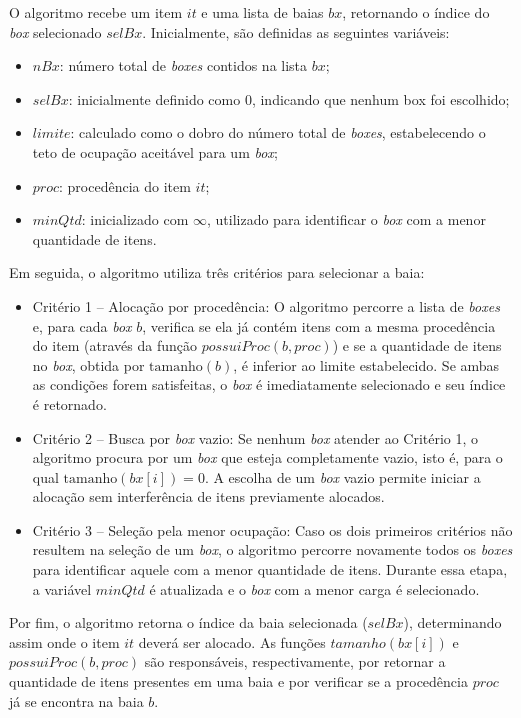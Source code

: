 \documentclass[
    12pt,                %
    openright,           %
    oneside,             %
    a4paper,             %
    english,             %
    spanish,             %
    brazil               %
]{ufscar}
\begin{document}
O algoritmo recebe um item \(it\) e uma lista de baias \(bx\), retornando o índice do \textit{box} selecionado \(selBx\). Inicialmente, são definidas as seguintes variáveis:
\begin{itemize}
    \item \(nBx\): número total de \textit{boxes} contidos na lista \(bx\);
    \item \(selBx\): inicialmente definido como 0, indicando que nenhum box foi escolhido;
    \item \(limite\): calculado como o dobro do número total de \textit{boxes}, estabelecendo o teto de ocupação aceitável para um \textit{box};
    \item \(proc\): procedência do item \(it\);
    \item \(minQtd\): inicializado com \(\infty\), utilizado para identificar o \textit{box} com a menor quantidade de itens.
\end{itemize}

Em seguida, o algoritmo utiliza três critérios para selecionar a baia:
\begin{itemize}
    \item Critério 1 – Alocação por procedência:
    O algoritmo percorre a lista de \textit{boxes} e, para cada \textit{box} \(b\), verifica se ela já contém itens com a mesma procedência do item (através da função \(possuiProc(b, proc)\)) e se a quantidade de itens no \textit{box}, obtida por \(\text{tamanho}(b)\), é inferior ao limite estabelecido. Se ambas as condições forem satisfeitas, o \textit{box} é imediatamente selecionado e seu índice é retornado. 

    \item Critério 2 – Busca por \textit{box} vazio: 
    Se nenhum \textit{box} atender ao Critério 1, o algoritmo procura por um \textit{box} que esteja completamente vazio, isto é, para o qual \(\text{tamanho}(bx[i]) = 0\). A escolha de um \textit{box} vazio permite iniciar a alocação sem interferência de itens previamente alocados.

    \item Critério 3 – Seleção pela menor ocupação:  
    Caso os dois primeiros critérios não resultem na seleção de um \textit{box}, o algoritmo percorre novamente todos os \textit{boxes} para identificar aquele com a menor quantidade de itens. Durante essa etapa, a variável \(minQtd\) é atualizada e o \textit{box} com a menor carga é selecionado.
\end{itemize}

Por fim, o algoritmo retorna o índice da baia selecionada (\(selBx\)), determinando assim onde o item \(it\) deverá ser alocado. As funções \(tamanho(bx[i])\) e \(possuiProc(b, proc)\) são responsáveis, respectivamente, por retornar a quantidade de itens presentes em uma baia e por verificar se a procedência \(proc\) já se encontra na baia \(b\). 
\end{document}
